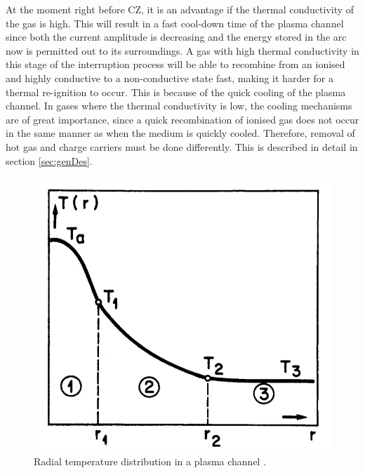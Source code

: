 \documentclass[10pt,a4paper,twoside]{article}
\begin{document}
At the moment right before CZ, it is an advantage if the thermal conductivity of the gas is high. This will result in a fast cool-down time of the plasma channel since both the current amplitude is decreasing and the energy stored in the arc now is permitted out to its surroundings. A gas with high thermal conductivity in this stage of the interruption process will be able to recombine from an ionised and highly conductive to a non-conductive state fast, making it harder for a thermal re-ignition to occur. This is because of the quick cooling of the plasma channel. In gases where the thermal conductivity is low, the cooling mechanisms are of great importance, since a quick recombination of ionised gas does not occur in the same manner as when the medium is quickly cooled. Therefore, removal of hot gas and charge carriers must be done differently. This is described in detail in section \ref{sec:genDes}.

\begin{figure}[H]
\centering
\includegraphics[scale=0.25]{Bilder/Theory/tempZonesArc.png}
\caption{Radial temperature distribution in a plasma channel \cite{bib:TDCIGBB}.} \label{fig:tempDist1}
\end{figure}
\end{document}
